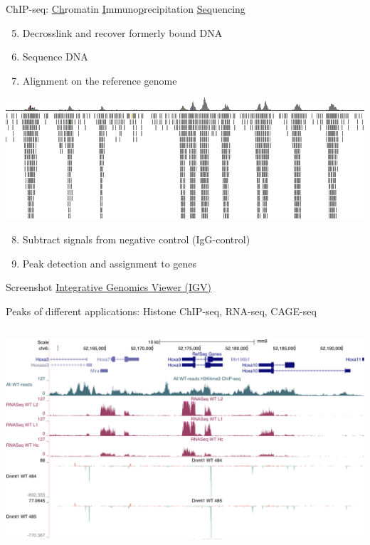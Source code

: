\documentclass[10pt]{beamer}
\newcommand{\credit}[1]{{\vspace{\fill} \par \raggedleft \scriptsize \mdseries \color{mDarkBrown} #1 \par}}
\begin{document}
\begin{frame}{ChIP-seq: \underline{Ch}romatin \underline{I}mmuno\underline{p}recipitation \underline{Seq}uencing}
	\begin{enumerate}
		\setcounter{enumi}{4}
		\item Decrosslink and recover formerly bound DNA
		\item Sequence DNA
		\item Alignment on the reference genome
	\end{enumerate}
	\begin{center}
		\includegraphics[width=\textwidth]{./figures/igvpeaks.png}
	\end{center}
	\begin{enumerate}
		\setcounter{enumi}{7}
		\item Subtract signals from negative control (IgG-control)
		\item Peak detection and assignment to genes
	\end{enumerate}
	\credit{Screenshot \href{ http://www.broadinstitute.org/igv/}{Integrative Genomics Viewer (IGV)}}
\end{frame}

\begin{frame}{Peaks of different applications: Histone ChIP-seq, RNA-seq,  CAGE-seq}
	\begin{columns}[T]
		\column{\dimexpr\paperwidth-10pt}
		\includegraphics[width=\textwidth]{./figures/peaks.png}
	\end{columns}
\end{frame}
\end{document}
